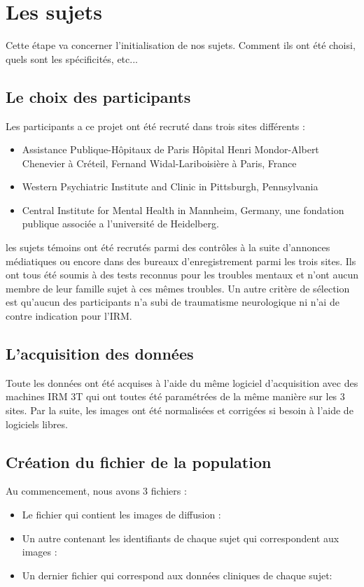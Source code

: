 \section{Les sujets}

Cette étape va concerner l'initialisation de nos sujets. Comment ils ont été choisi, quels sont les spécificités, etc...

\subsection{Le choix des participants}

Les participants a ce projet ont été recruté dans trois sites différents : 
\begin{itemize}
	\item Assistance Publique-Hôpitaux de Paris Hôpital Henri Mondor-Albert Chenevier à Créteil, Fernand Widal-Lariboisière à Paris, France
	\item Western Psychiatric Institute and Clinic in Pittsburgh, Pennsylvania
	\item Central Institute for Mental Health in Mannheim, Germany, une fondation publique associée a l'université de Heidelberg.
\end{itemize}
les sujets témoins ont été recrutés parmi des contrôles à la suite d'annonces médiatiques ou encore dans des bureaux d'enregistrement parmi les trois sites. Ils ont tous été soumis à des tests reconnus pour les troubles mentaux et n'ont aucun membre de leur famille sujet à ces mêmes troubles. Un autre critère de sélection est qu'aucun des participants n'a subi de traumatisme neurologique ni n'ai de contre indication pour l'IRM.


\subsection{L'acquisition des données}

Toute les données ont été acquises à l'aide du même logiciel d'acquisition avec des machines IRM 3T qui ont toutes été paramétrées de la même manière sur les 3 sites. Par la suite, les images ont été normalisées et corrigées si besoin à l'aide de logiciels libres.

\subsection{Création du fichier de la population} 

Au commencement, nous avons 3 fichiers :
\begin{itemize}
	\item Le fichier qui contient les images de diffusion : 
	\item Un autre contenant les identifiants de chaque sujet qui correspondent aux images : 
	\item Un dernier fichier qui correspond aux données cliniques de chaque sujet:  
\end{itemize}

